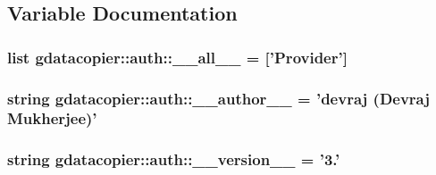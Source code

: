 \subsection{\-Variable \-Documentation}
\hypertarget{namespacegdatacopier_1_1auth_a842b1f57e92169f65eb0825215da4f67}{
\subsubsection[{\-\_\-\-\_\-all\-\_\-\-\_\-}]{\setlength{\rightskip}{0pt plus 5cm}list {\bf gdatacopier\-::auth\-::\-\_\-\-\_\-all\-\_\-\-\_\-} = \mbox{[}'{\bf \-Provider}'\mbox{]}}}\label{namespacegdatacopier_1_1auth_a842b1f57e92169f65eb0825215da4f67}
\hypertarget{namespacegdatacopier_1_1auth_a9086c0d0063461d414309638f94f9b59}{
\subsubsection[{\-\_\-\-\_\-author\-\_\-\-\_\-}]{\setlength{\rightskip}{0pt plus 5cm}string {\bf gdatacopier\-::auth\-::\-\_\-\-\_\-author\-\_\-\-\_\-} = 'devraj (\-Devraj \-Mukherjee)'}}\label{namespacegdatacopier_1_1auth_a9086c0d0063461d414309638f94f9b59}
\hypertarget{namespacegdatacopier_1_1auth_a113ca92de81467af4472f44c1faf7506}{
\subsubsection[{\-\_\-\-\_\-version\-\_\-\-\_\-}]{\setlength{\rightskip}{0pt plus 5cm}string {\bf gdatacopier\-::auth\-::\-\_\-\-\_\-version\-\_\-\-\_\-} = '3.'}}\label{namespacegdatacopier_1_1auth_a113ca92de81467af4472f44c1faf7506}
